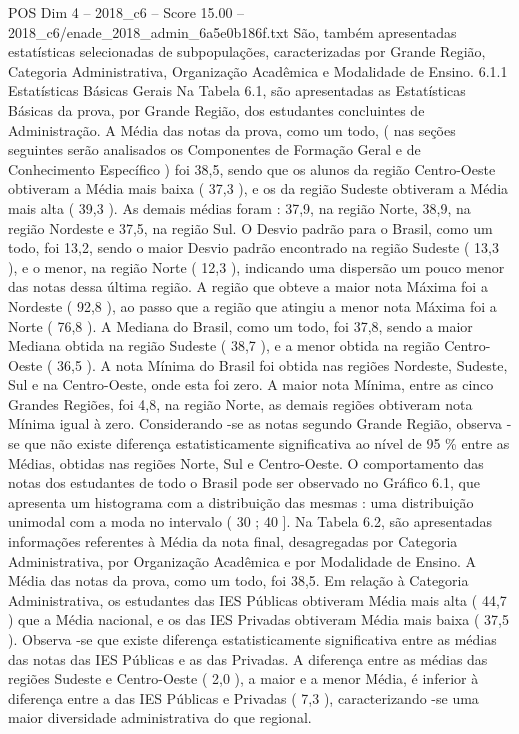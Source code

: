 \begin{textsample}{POS Dim 4 – 2018\_c6 – Score 15.00 – 2018\_c6/enade\_2018\_admin\_6a5e0b186f.txt}
São, também apresentadas estatísticas selecionadas de subpopulações, caracterizadas por Grande Região, Categoria Administrativa, Organização Acadêmica e Modalidade de Ensino. 6.1.1 Estatísticas Básicas Gerais Na Tabela 6.1, são apresentadas as Estatísticas Básicas da prova, por Grande Região, dos estudantes concluintes de Administração.
A Média das notas da prova, como um todo, ( nas seções seguintes serão analisados os Componentes de Formação Geral e de Conhecimento Específico ) foi 38,5, sendo que os alunos da região Centro-Oeste obtiveram a Média mais baixa ( 37,3 ), e os da região Sudeste obtiveram a Média mais alta ( 39,3 ).
As demais médias foram : 37,9, na região Norte, 38,9, na região Nordeste e 37,5, na região Sul.
O Desvio padrão para o Brasil, como um todo, foi 13,2, sendo o maior Desvio padrão encontrado na região Sudeste ( 13,3 ), e o menor, na região Norte ( 12,3 ), indicando uma dispersão um pouco menor das notas dessa última região.
A região que obteve a maior nota Máxima foi a Nordeste ( 92,8 ), ao passo que a região que atingiu a menor nota Máxima foi a Norte ( 76,8 ).
A Mediana do Brasil, como um todo, foi 37,8, sendo a maior Mediana obtida na região Sudeste ( 38,7 ), e a menor obtida na região Centro-Oeste ( 36,5 ).
A nota Mínima do Brasil foi obtida nas regiões Nordeste, Sudeste, Sul e na Centro-Oeste, onde esta foi zero.
A maior nota Mínima, entre as cinco Grandes Regiões, foi 4,8, na região Norte, as demais regiões obtiveram nota Mínima igual à zero.
Considerando -se as notas segundo Grande Região, observa -se que não existe diferença estatisticamente significativa ao nível de 95 \% entre as Médias, obtidas nas regiões Norte, Sul e Centro-Oeste.
O comportamento das notas dos estudantes de todo o Brasil pode ser observado no Gráfico 6.1, que apresenta um histograma com a distribuição das mesmas : uma distribuição unimodal com a moda no intervalo ( 30 ; 40 ].
Na Tabela 6.2, são apresentadas informações referentes à Média da nota final, desagregadas por Categoria Administrativa, por Organização Acadêmica e por Modalidade de Ensino.
A Média das notas da prova, como um todo, foi 38,5.
Em relação à Categoria Administrativa, os estudantes das IES Públicas obtiveram Média mais alta ( 44,7 ) que a Média nacional, e os das IES Privadas obtiveram Média mais baixa ( 37,5 ).
Observa -se que existe diferença estatisticamente significativa entre as médias das notas das IES Públicas e as das Privadas.
A diferença entre as médias das regiões Sudeste e Centro-Oeste ( 2,0 ), a maior e a menor Média, é inferior à diferença entre a das IES Públicas e Privadas ( 7,3 ), caracterizando -se uma maior diversidade administrativa do que regional.

\end{textsample}
